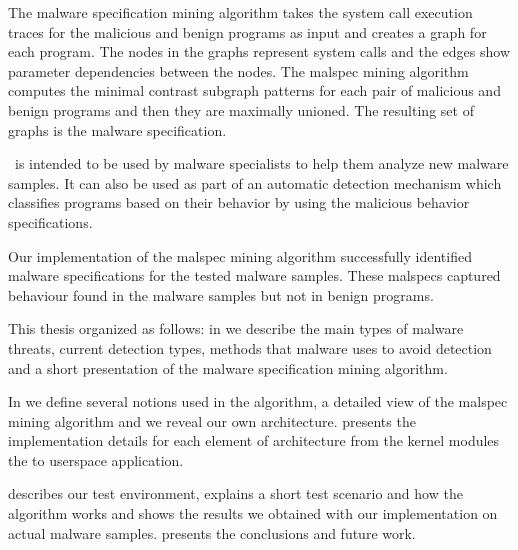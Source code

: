 The malware specification mining algorithm takes the system call execution traces for the malicious and benign programs as input and creates a graph for each program. The nodes in the graphs represent system calls and the edges show parameter dependencies between the nodes. The malspec mining algorithm computes the minimal contrast subgraph patterns for each pair of malicious and benign programs and then they are maximally unioned. The resulting set of graphs is the malware specification.

\project\ is intended to be used by malware specialists to help them analyze new malware samples. It can also be used as part of an automatic detection mechanism which classifies programs based on their behavior by using the malicious behavior specifications.

Our implementation of the malspec mining algorithm successfully identified malware specifications for the tested malware samples. These malspecs captured behaviour found in the malware samples but not in benign programs.

This thesis organized as follows: in  we describe the main types of malware threats, current detection types, methods that malware uses to avoid detection and a short presentation of the malware specification mining algorithm.

In  we define several notions used in the algorithm, a detailed view of the malspec mining algorithm and we reveal our own architecture.  presents the implementation details for each element of architecture from the kernel modules the to userspace application.

 describes our test environment, explains a short test scenario and how the algorithm works and shows the results we obtained with our implementation on actual malware samples.  presents the conclusions and future work.